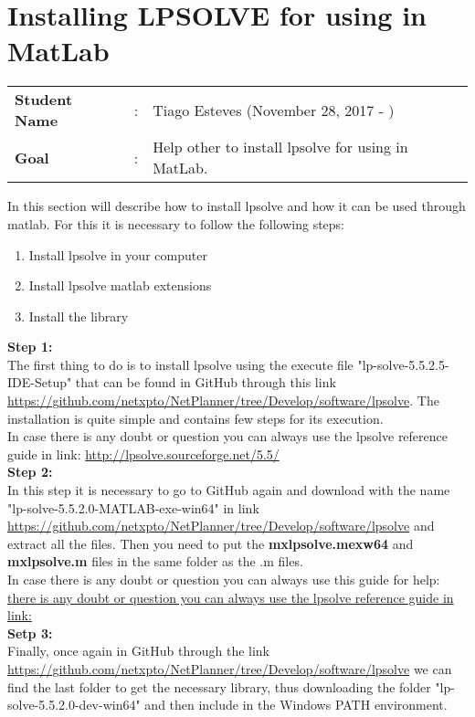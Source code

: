 \clearpage

\section{Installing LPSOLVE for using in MatLab}
\begin{tcolorbox}	
\begin{tabular}{p{2.75cm} p{0.2cm} p{10.5cm}} 	
\textbf{Student Name}  &:& Tiago Esteves        (November 28, 2017 - )\\
\textbf{Goal}          &:& Help other to install lpsolve for using in MatLab.
\end{tabular}
\end{tcolorbox}


In this section will describe how to install lpsolve and how it can be used through matlab. For this it is necessary to follow the following steps:
\begin{enumerate}
  \item Install lpsolve in your computer
  \item Install lpsolve matlab extensions
  \item Install the library
\end{enumerate}

\textbf{Step 1:}\\
The first thing to do is to install lpsolve using the execute file "lp-solve-5.5.2.5-IDE-Setup" that can be found in GitHub through this link \url{https://github.com/netxpto/NetPlanner/tree/Develop/software/lpsolve}. The installation is quite simple and contains few steps for its execution. \\
In case there is any doubt or question you can always use the lpsolve reference guide in link: \url{http://lpsolve.sourceforge.net/5.5/} \\

\textbf{Step 2:}\\
In this step it is necessary to go to GitHub again and download with the name "lp-solve-5.5.2.0-MATLAB-exe-win64" in link \url{https://github.com/netxpto/NetPlanner/tree/Develop/software/lpsolve} and extract all the files. Then you need to put the \textbf{mxlpsolve.mexw64} and \textbf{mxlpsolve.m} files in the same folder as the .m files. \\
In case there is any doubt or question you can always use this guide for help: \url{there is any doubt or question you can always use the lpsolve reference guide in link:} \\

\textbf{Setp 3:}\\
Finally, once again in GitHub through the link \url{https://github.com/netxpto/NetPlanner/tree/Develop/software/lpsolve} we can find the last folder to get the necessary library, thus downloading the folder "lp-solve-5.5.2.0-dev-win64" and then include in the Windows PATH environment. \\

